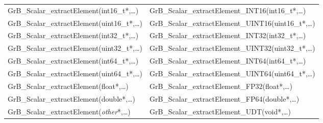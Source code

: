 \begin{table}[htb]
{\begin{tabular}{l|l}
{\sf GrB\_Scalar\_extractElement(int16\_t*,\ldots)}		& {\sf GrB\_Scalar\_extractElement\_INT16(int16\_t*,\ldots)} \\
{\sf GrB\_Scalar\_extractElement(uint16\_t*,\ldots)}		& {\sf GrB\_Scalar\_extractElement\_UINT16(uint16\_t*,\ldots)} \\
{\sf GrB\_Scalar\_extractElement(int32\_t*,\ldots)}		& {\sf GrB\_Scalar\_extractElement\_INT32(int32\_t*,\ldots)} \\
{\sf GrB\_Scalar\_extractElement(uint32\_t*,\ldots)}		& {\sf GrB\_Scalar\_extractElement\_UINT32(uint32\_t*,\ldots)} \\
{\sf GrB\_Scalar\_extractElement(int64\_t*,\ldots)}		& {\sf GrB\_Scalar\_extractElement\_INT64(int64\_t*,\ldots)} \\
{\sf GrB\_Scalar\_extractElement(uint64\_t*,\ldots)}		& {\sf GrB\_Scalar\_extractElement\_UINT64(uint64\_t*,\ldots)} \\
{\sf GrB\_Scalar\_extractElement(float*,\ldots)}		& {\sf GrB\_Scalar\_extractElement\_FP32(float*,\ldots)} \\
{\sf GrB\_Scalar\_extractElement(double*,\ldots)}		& {\sf GrB\_Scalar\_extractElement\_FP64(double*,\ldots)} \\
{\sf GrB\_Scalar\_extractElement(\emph{other}*,\ldots)}		& {\sf GrB\_Scalar\_extractElement\_UDT(void*,\ldots)} \\ 
\hline
\end{tabular}
}
\label{Tab:NonPolymorphic1a}
\end{table}


